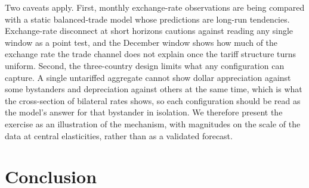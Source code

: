 \documentclass[11pt]{article}
\theoremstyle{plain}
\theoremstyle{remark}
\numberwithin{lemma}{section}
\numberwithin{proposition}{section}
\numberwithin{corollary}{section}
\newenvironment{revblock}{\par\begingroup\color{RevBlue}}{\endgroup\par}
\begin{document}
\begin{revblock}
Two caveats apply. First, monthly exchange-rate observations are being compared with a static balanced-trade model whose predictions are long-run tendencies. Exchange-rate disconnect at short horizons \citep{itskhoki2021} cautions against reading any single window as a point test, and the December window shows how much of the exchange rate the trade channel does not explain once the tariff structure turns uniform. Second, the three-country design limits what any configuration can capture. A single untariffed aggregate cannot show dollar appreciation against some bystanders and depreciation against others at the same time, which is what the cross-section of bilateral rates shows, so each configuration should be read as the model's answer for that bystander in isolation. We therefore present the exercise as an illustration of the mechanism, with magnitudes on the scale of the data at central elasticities, rather than as a validated forecast.
\end{revblock}

\section{Conclusion}
\label{sec:conclusion}
\end{document}
